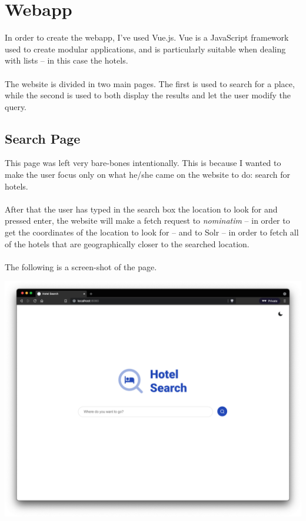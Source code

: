\documentclass[unicode,11pt,a4paper,oneside,numbers=endperiod,openany]{scrartcl}
\begin{document}
\section{Webapp}
In order to create the webapp, I've used Vue.js. Vue is a JavaScript framework used to create modular applications, and is particularly suitable when dealing with lists -- in this case the hotels. \\ \\
The website is divided in two main pages. The first is used to search for a place, while the second is used to both display the results and let the user modify the query.

\subsection{Search Page}
This page was left very bare-bones intentionally. This is because I wanted to make the user focus only on what he/she came on the website to do: search for hotels. \\ \\
After that the user has typed in the search box the location to look for and pressed enter, the website will make a fetch request to \textit{nominatim} -- in order to get the coordinates of the location to look for -- and to Solr -- in order to fetch all of the hotels that are geographically closer to the searched location. \\ \\
The following is a screen-shot of the page.

\begin{center}
	\includegraphics[width=15cm]{./main.png}
\end{center}
\end{document}

